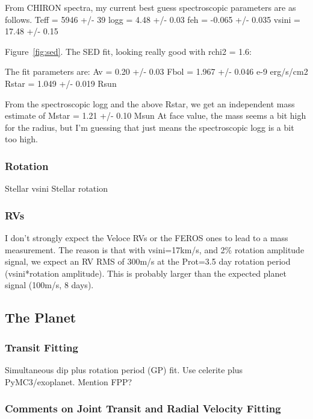 \documentclass[12pt,twocolumn,tighten]{aastex63}
\begin{document}
From CHIRON spectra, my current best guess spectroscopic parameters
 are as follows.
 Teff = 5946 +/- 39
 logg = 4.48 +/- 0.03
 feh = -0.065 +/- 0.035
 vsini = 17.48 +/- 0.15

Figure~\ref{fig:sed}.
The SED fit, looking really good with rchi2 = 1.6: 

The fit parameters are: 
Av = 0.20 +/- 0.03
Fbol = 1.967 +/- 0.046 e-9 erg/s/cm2 
Rstar = 1.049 +/- 0.019 Rsun 

From the spectroscopic logg and the above Rstar, we get an independent
mass estimate of 
Mstar = 1.21 +/- 0.10 Msun 
At face value, the mass seems a bit high for the radius, but I'm
guessing that just means the spectroscopic logg is a bit too high. 



\subsubsection{Rotation}
Stellar vsini
Stellar rotation

\subsubsection{RVs}
I don't strongly expect the Veloce RVs or the FEROS ones to lead to a
mass measurement. The reason is that with vsini=17km/s, and 2\%
rotation amplitude signal, we expect an RV RMS of 300m/s at the
Prot=3.5 day rotation period (vsini*rotation amplitude). This is
probably larger than the expected planet signal (100m/s, 8 days).




\subsection{The Planet}
\label{subsec:planet}

\subsubsection{Transit Fitting}
Simultaneous dip plus rotation period (GP) fit. Use celerite plus PyMC3/exoplanet.
Mention FPP?


\subsubsection{Comments on Joint Transit and Radial Velocity Fitting}
\end{document}

